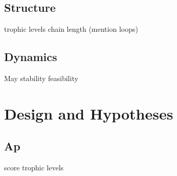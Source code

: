 \subsection{Structure}
trophic levels
chain length
(mention loops)
\subsection{Dynamics}
May stability
feasibility

\section{Design and Hypotheses}
\subsection{Ap}
score
trophic levels


